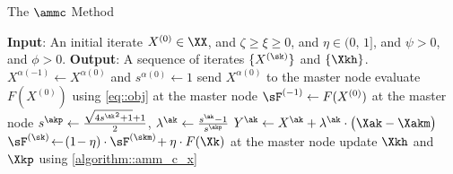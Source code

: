 \begin{algorithm}[t]
	\caption{The $\ammc$ Method}
	\label{algorithm::ammc}
	\begin{algorithmic}[1]
		\State\textbf{Input}: An initial iterate $X^{(0)}\in \XX$, and $\zeta \geq \xi \geq 0$, and $\eta\in(0,\,1]$, and $\psi>0$, and $\phi>0$.
		\State\textbf{Output}: A sequence of iterates $\{X^{(\sk)}\}$ and $\{\Xkh\}$. 	
		\vspace{0.1em}
		\vspace{0.1em}
		\State $X^{\alpha(-1)}\gets X^{\alpha(0)}$ and $s^{\alpha(0)}\gets 1$\label{line::alg3::s0}
		\vspace{0.1em}
		\State send $X^{\alpha(0)}$ to the master node \label{line::alg3::mcomm1}
		\EndFor
		\State evaluate $F(X^{(0)})$ using \cref{eq::obj} at the master node \label{line::alg3::F0} 
		\vspace{0.1em}
		\State $\sF^{(-1)}\leftarrow F(X^{(0)})$ at the master node  \label{line::alg3::lF0}
		\vspace{0.1em}
				\vspace{0.2em}
		\vspace{0.1em}
		\State $s^{\akp}\gets\tfrac{\sqrt{4{s^{\ak}}^2+1}+1}{2}$,\; $\lambda^{\ak}\gets \tfrac{s^{\ak}-1}{s^{\akp}}$\label{line::alg3::sk}
		\vspace{0.15em}
		\State $Y^{\ak}\gets X^{\ak}+\lambda^{\ak}\cdot\big(\Xak-\Xakm\big)$\label{line::alg3::Yk}
		\vspace{0.1em}
		\EndFor
		\vspace{0.1em}
		\State $\sF^{(\sk)}\! \leftarrow \!(1\!-\eta)\cdot\sF^{(\skm)}\!+\eta\cdot F(\Xk)$ at the master node \label{line::alg3::lFk}
		\vspace{-0.75em}
		\State update $\Xkh$ and $\Xkp$ using \cref{algorithm::amm_c_x}
		\EndFor
	\end{algorithmic}
\end{algorithm}